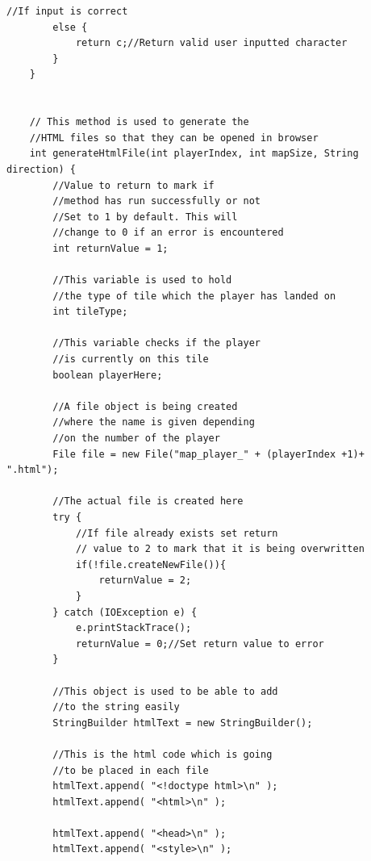 \documentclass[a4paper,12pt]{extarticle}
\begin{document}
\begin{lstlisting}[caption=The initial code of the Game class, label=amb]
        //If input is correct
        else {
            return c;//Return valid user inputted character
        }
    }


    // This method is used to generate the 
    //HTML files so that they can be opened in browser
    int generateHtmlFile(int playerIndex, int mapSize, String direction) {
        //Value to return to mark if 
        //method has run successfully or not
        //Set to 1 by default. This will 
        //change to 0 if an error is encountered
        int returnValue = 1;

        //This variable is used to hold 
        //the type of tile which the player has landed on
        int tileType;

        //This variable checks if the player 
        //is currently on this tile
        boolean playerHere;

        //A file object is being created 
        //where the name is given depending 
        //on the number of the player
        File file = new File("map_player_" + (playerIndex +1)+ ".html");

        //The actual file is created here
        try {
            //If file already exists set return
            // value to 2 to mark that it is being overwritten
            if(!file.createNewFile()){
                returnValue = 2;
            }
        } catch (IOException e) {
            e.printStackTrace();
            returnValue = 0;//Set return value to error
        }

        //This object is used to be able to add 
        //to the string easily
        StringBuilder htmlText = new StringBuilder();

        //This is the html code which is going 
        //to be placed in each file
        htmlText.append( "<!doctype html>\n" );
        htmlText.append( "<html>\n" );

        htmlText.append( "<head>\n" );
        htmlText.append( "<style>\n" );


\end{lstlisting}
\end{document}
